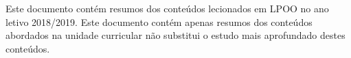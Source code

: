 \documentclass[../resumosLPOO.tex]{subfiles}
\begin{document}
 

Este documento contém resumos dos conteúdos lecionados em LPOO no ano letivo 2018/2019. Este documento contém apenas resumos dos conteúdos abordados na unidade curricular não substitui o estudo mais aprofundado destes conteúdos.
\end{document}
